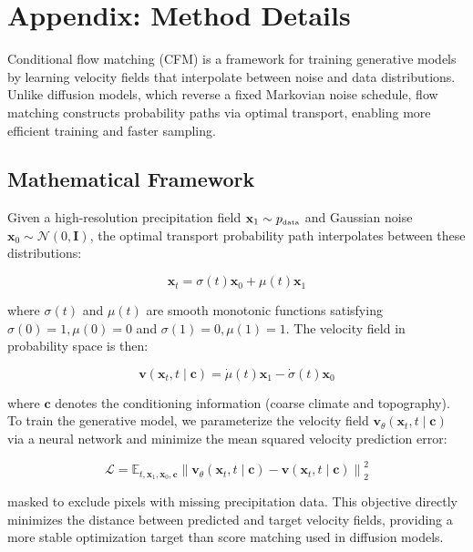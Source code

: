 \documentclass[12pt]{article}
\begin{document}
\section{Appendix: Method Details}

Conditional flow matching (CFM) is a framework for training generative models by learning velocity fields that interpolate between noise and data distributions. Unlike diffusion models, which reverse a fixed Markovian noise schedule, flow matching constructs probability paths via optimal transport, enabling more efficient training and faster sampling.

\subsection{Mathematical Framework}

Given a high-resolution precipitation field $\mathbf{x}_1 \sim p_{\mbox{\tiny data}}$ and Gaussian noise $\mathbf{x}_0 \sim \mathcal{N}(0, \mathbf{I})$, the optimal transport probability path interpolates between these distributions:

    $$\mathbf{x}_t = \sigma(t) \mathbf{x}_0 + \mu(t) \mathbf{x}_1$$
    
where $\sigma(t)$ and $\mu(t)$ are smooth monotonic functions satisfying $\sigma(0)=1, \mu(0)=0$ and $\sigma(1)=0, \mu(1)=1$. The velocity field in probability space is then:

    $$\mathbf{v}(\mathbf{x}_t, t \mid \mathbf{c}) = \dot{\mu}(t) \mathbf{x}_1 - \dot{\sigma}(t) \mathbf{x}_0$$
    
where $\mathbf{c}$ denotes the conditioning information (coarse climate and topography). To train the generative model, we parameterize the velocity field $\mathbf{v}_\theta(\mathbf{x}_t, t \mid \mathbf{c})$ via a neural network and minimize the mean squared velocity prediction error:

    $$\mathcal{L} = \mathbb{E}_{t, \mathbf{x}_1, \mathbf{x}_0, \mathbf{c}} \left\| \mathbf{v}_\theta(\mathbf{x}_t, t \mid \mathbf{c}) - \mathbf{v}(\mathbf{x}_t, t \mid \mathbf{c}) \right\|_2^2$$
    
masked to exclude pixels with missing precipitation data. This objective directly minimizes the distance between predicted and target velocity fields, providing a more stable optimization target than score matching used in diffusion models.






\end{document}
